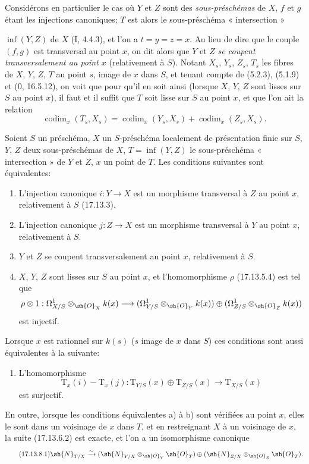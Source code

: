 \begin{env}[17.13.7]
\label{IV.17.13.7}
Considérons en particulier le cas où $Y$ et $Z$ sont des \emph{sous-préschémas} de $X$, $f$ et $g$ étant les injections canoniques; $T$ est alors le sous-préschéma « intersection »


$\inf(Y,Z)$ de $X$ (I, 4.4.3), et l'on a $t=y=z=x$. Au lieu de dire que le couple $(f,g)$ est transversal au point $x$, on dit alors que $Y$ et $Z$ \emph{se coupent transversalement au point $x$} (relativement à $S$). Notant $X_s$, $Y_s$, $Z_s$, $T_s$ les fibres de $X$, $Y$, $Z$, $T$ au point $s$, image de $x$ dans $S$, et tenant compte de (5.2.3), (5.1.9) et (0, 16.5.12), on voit que pour qu'il en soit ainsi (lorsque $X$, $Y$, $Z$ sont lisses sur $S$ au point $x$), il faut et il suffit que $T$ soit lisse sur $S$ au point $x$, et que l'on ait la relation
\[
\label{IV.17.13.7.1}
\tag{17.13.7.1}
\operatorname{codim}_x(T_s,X_s)=\operatorname{codim}_x(Y_s,X_s)+\operatorname{codim}_x(Z_s,X_s).
\]
\end{env}

\begin{proposition}[17.13.8]
\label{IV.17.13.8}
Soient $S$ un préschéma, $X$ un $S$-préschéma localement de présentation finie sur $S$, $Y$, $Z$ deux sous-préschémas de $X$, $T=\inf(Y,Z)$ le sous-préschéma « intersection » de $Y$ et $Z$, $x$ un point de $T$. Les conditions suivantes sont équivalentes:
\begin{enumerate}
  \item[a)] L'injection canonique $i:Y\to X$ est un morphisme transversal à $Z$ au point $x$, relativement à $S$ (17.13.3).
  \item[a')] L'injection canonique $j:Z\to X$ est un morphisme transversal à $Y$ au point $x$, relativement à $S$.
  \item[a'')] $Y$ et $Z$ se coupent transversalement au point $x$, relativement à $S$.
  \item[b)] $X$, $Y$, $Z$ sont lisses sur $S$ au point $x$, et l'homomorphisme $\rho$ (17.13.5.4) est tel que
  \[
  \rho\otimes1:\Omega^1_{X/S}\otimes_{\sh{O}_X}k(x)\to
  (\Omega^1_{Y/S}\otimes_{\sh{O}_Y}k(x))\oplus
  (\Omega^1_{Z/S}\otimes_{\sh{O}_Z}k(x))
  \]
  est injectif.
\end{enumerate}
Lorsque $x$ est rationnel sur $k(s)$ ($s$ image de $x$ dans $S$) ces conditions sont aussi équivalentes à la suivante:
\begin{enumerate}
  \item[b')] L'homomorphisme
  \[
  \mathrm{T}_x(i)-\mathrm{T}_x(j):\mathrm{T}_{Y/S}(x)\oplus\mathrm{T}_{Z/S}(x)\to\mathrm{T}_{X/S}(x)
  \]
  est surjectif.
\end{enumerate}
En outre, lorsque les conditions équivalentes a) à b) sont vérifiées au point $x$, elles le sont dans un voisinage de $x$ dans $T$, et en restreignant $X$ à un voisinage de $x$, la suite (17.13.6.2) est exacte, et l'on a un isomorphisme canonique
\[
\label{IV.17.13.8.1}
\tag{17.13.8.1}
\sh{N}_{T/X}\xrightarrow{\sim}
(\sh{N}_{Y/X}\otimes_{\sh{O}_Y}\sh{O}_T)\oplus
(\sh{N}_{Z/X}\otimes_{\sh{O}_Z}\sh{O}_T).
\]
\end{proposition}

